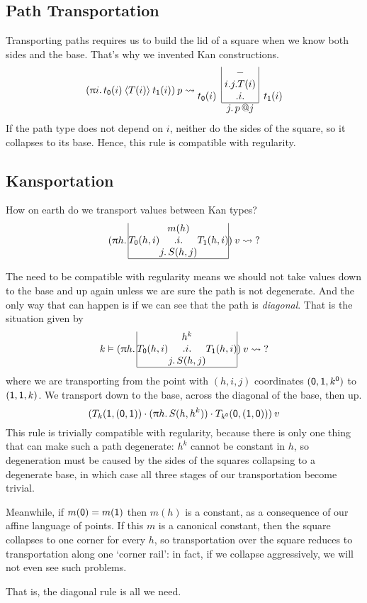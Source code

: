 \documentclass{article}
\makeatletter
\newcommand{\PATH}[3]{#2\mathbin{\blue{\langle}#1\blue{\rangle}}#3}
\newcommand{\pa}[1]{\red{\uppi}#1.\,}
\newcommand{\ze}{{\orange{\mathsf{0}}}}
\newcommand{\un}{{\orange{\mathsf{1}}}}
\newcommand{\pj}{\,\orange{@}}
\newcommand{\KAN}[6]{\blue{\begin{array}{|@{}r@{}c@{}l@{}|}
                        & \black{#6} & \\
                     \black{#2} & \black{.#1.} & \black{#3} \\
                        & \black{#4.\,#5} & \\
                      \hline
                     \end{array}}}
\newcommand{\hkan}[7]{\green{\begin{array}{@{}r|@{}c@{}|l@{}}
                        & \black{#7} & \\
                        & \black{#1} &\\
                     \black{#3} & \black{.#2.} & \black{#4} \\
                        \cline{2-2}
               \multicolumn{1}{r}{}         & \multicolumn{1}{c}{\black{#5.\,#6}} & \\
                     \end{array}}}
\makeatother
\begin{document}
\subsection{Path Transportation}

Transporting paths requires us to build the lid of a square when we
know both sides and the base. That's why we invented Kan
constructions.
\[
(\pa i \PATH{T(i)}{t_\ze(i)}{t_\un(i)})\:p \leadsto
\hkan{i.j.T(i)}i{t_\ze(i)}{t_\un(i)}j{p\pj j}{-}
\]
If the path type does not depend on $i$, neither do the sides of the
square, so it collapses to its base. Hence, this rule is compatible
with regularity.


\subsection{Kansportation}

How on earth do we transport values between Kan types?
\[
(\pa h \KAN i{T_\ze(h,i)}{T_\un(h,i)}j{S(h,j)}{m(h)})\:v \leadsto \;?
\]

The need to be compatible with regularity means we should not take
values down to the base and up again unless we are sure the path is
not degenerate. And the only way that can happen is if we can see
that the path is \emph{diagonal}. That is the situation given by
\[
k\vDash (\pa h \KAN i{T_\ze(h,i)}{T_\un(h,i)}j{S(h,j)}{h^k})\:v \leadsto \;?
\]
where we are transporting from the point with $(h,i,j)$ coordinates
$(\ze,\un,k^\ze)$ to $(\un,\un,k)$. We transport down to the base,
across the diagonal of the base, then up.
\[
 (T_{k}(\un,(\ze,\un)) \cdot (\pa h S(h,h^k)) \cdot T_{k^\ze}(\ze,(\un,\ze)))\:v
\]
This rule is trivially compatible with regularity, because there is
only one thing that can make such a path degenerate: $h^k$ cannot be constant
in $h$, so degeneration must be caused by the sides of the squares
collapsing to a degenerate base, in which case all three stages of our
transportation become trivial.

Meanwhile, if $m(\ze)=m(\un)$ then $m(h)$ is a constant, as a
consequence of our affine language of points. If this $m$ is a
canonical constant, then the square collapses to one corner for every
$h$, so transportation over the square reduces to transportation along
one `corner rail': in fact, if we collapse aggressively, we will not
even see such problems.

That is, the diagonal rule is all we need.
\end{document}

